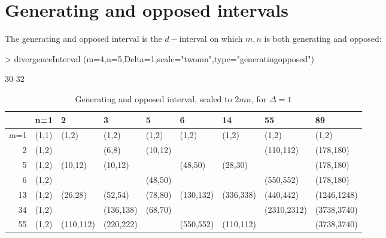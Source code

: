 \documentclass[a4paper]{article}
\begin{document}
\clearpage
\section{Generating and opposed intervals}

The generating and opposed interval is the $d-$interval on which $m,n$ is both generating and opposed:
\begin{Schunk}
\begin{Sinput}
> divergenceInterval (m=4,n=5,Delta=1,scale="twomn",type="generatingopposed")
\end{Sinput}
\begin{Soutput}
[1] 30 32
\end{Soutput}
\end{Schunk}


\begin{table}[ht]
\centering
\begin{tabular}{rllllllll}
  \hline
 & n=1 & 2 & 3 & 5 & 6 & 14 & 55 & 89 \\ 
  \hline
m=1 & (1,1) & (1,2) & (1,2) & (1,2) & (1,2) & (1,2) & (1,2) & (1,2) \\ 
  2 & (1,2) &  & (6,8) & (10,12) &  &  & (110,112) & (178,180) \\ 
  5 & (1,2) & (10,12) & (10,12) &  & (48,50) & (28,30) &  & (178,180) \\ 
  6 & (1,2) &  &  & (48,50) &  &  & (550,552) & (178,180) \\ 
  13 & (1,2) & (26,28) & (52,54) & (78,80) & (130,132) & (336,338) & (440,442) & (1246,1248) \\ 
  34 & (1,2) &  & (136,138) & (68,70) &  &  & (2310,2312) & (3738,3740) \\ 
  55 & (1,2) & (110,112) & (220,222) &  & (550,552) & (110,112) &  & (3738,3740) \\ 
   \hline
\end{tabular}
\caption{Generating and opposed interval, scaled to $2mn$, for $\Delta=1$} 
\label{tab:genopintp}
\end{table}%
\end{document}
